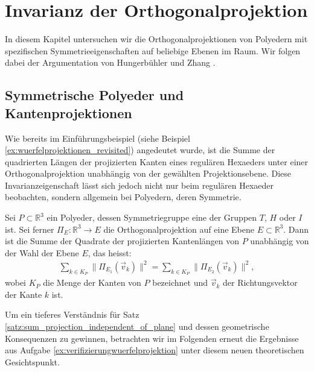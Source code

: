 \section{Invarianz der Orthogonalprojektion} \label{sec:orthogonalprojektionen}
In diesem Kapitel untersuchen wir die Orthogonalprojektionen von Polyedern mit spezifischen Symmetrieeigenschaften auf beliebige Ebenen im Raum. Wir folgen dabei der Argumentation von Hungerbühler und Zhang \cite{hungerbuehler_symmetric_polyhedra}.

\subsection{Symmetrische Polyeder und Kantenprojektionen}
Wie bereits im Einführungsbeispiel (siehe Beispiel \ref{ex:wuerfelprojektionen_revisited}) angedeutet wurde, ist die Summe der quadrierten Längen der projizierten Kanten eines regulären Hexaeders unter einer Orthogonalprojektion unabhängig von der gewählten Projektionsebene. Diese Invarianzeigenschaft lässt sich jedoch nicht nur beim regulären Hexaeder beobachten, sondern allgemein bei Polyedern, deren Symmetrie.

\begin{theorem} \label{satz:sum_projection_independent_of_plane}
    Sei $P \subset \mathbb{R}^3$ ein Polyeder, dessen Symmetriegruppe eine der Gruppen $T$, $H$ oder $I$ ist. Sei ferner $\Pi_{E}: \mathbb{R}^3 \to E$ die Orthogonalprojektion auf eine Ebene $E \subset \mathbb{R}^3$. Dann ist die Summe der Quadrate der projizierten Kantenlängen von $P$ unabhängig von der Wahl der Ebene $E$, das heisst:
    \begin{align} \label{eq:sum_projection_independent_of_plane}
        \sum_{k \in K_{P}} \|\Pi_{E_1}(\vec{v}_k)\|^2 = \sum_{k \in K_P} \|\Pi_{E_2}(\vec{v}_k)\|^2,
    \end{align}
    wobei $K_{P}$ die Menge der Kanten von $P$ bezeichnet und $\vec{v}_k$ der Richtungsvektor der Kante $k$ ist.
\end{theorem}

Um ein tieferes Verständnis für Satz \ref{satz:sum_projection_independent_of_plane} und dessen geometrische Konsequenzen zu gewinnen, betrachten wir im Folgenden erneut die Ergebnisse aus Aufgabe \ref{ex:verifizierungwuerfelprojektion} unter diesem neuen theoretischen Gesichtspunkt.

